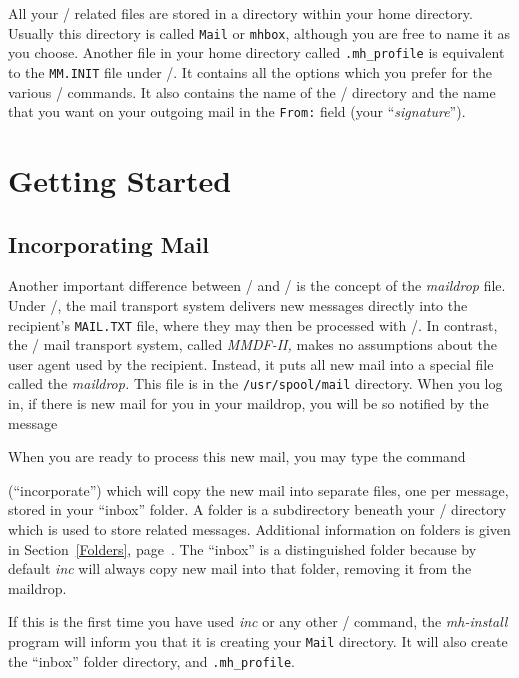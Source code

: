 All your \MH/ related files are stored in a directory within your home
directory.  Usually this directory is called {\tt Mail} or {\tt mhbox},
although you are free to name it as you choose.  Another file in your home
directory called \verb|.mh_profile| is equivalent to the {\tt MM.INIT} file
under \MM/.  It contains all the options which you prefer for the various
\MH/ commands.  It also contains the name of the \MH/ directory and the
name that you want on your outgoing mail in the {\tt From:} field (your
``{\em signature\/}'').

\section{Getting Started}

\subsection{Incorporating Mail}

Another important difference between \MM/ and \MH/ is the concept of the
{\em maildrop\/} file.  Under /, the mail transport system delivers
new messages directly into the recipient's {\tt MAIL.TXT} file, where they may
then be processed with \MM/.  In contrast, the \unix/ mail transport system,
called {\it MMDF-II,} makes no assumptions about the user agent used by the
recipient.  Instead, it puts all new mail into a special file called the
{\em maildrop.}  This file is in the \verb|/usr/spool/mail| directory.
When you log in, if there is new mail for you in your
maildrop, you will be so notified by the message


When you are ready to process this new mail, you may type the command


(``incorporate'') which will copy the new mail into separate files, one per
message, stored in your ``inbox'' folder.  A folder is a subdirectory
beneath your \MH/ directory which is used to store related messages.
Additional information on folders is given in Section~\ref{Folders},
page~\pageref{Folders}.  The
``inbox'' is a distinguished folder because by default {\it inc\/} will
always copy new mail into that folder, removing it from the maildrop.

If this is the first time you have used {\it inc\/} or any other \MH/
command, the {\it mh-install\/} program  will inform you that it is
creating your {\tt Mail} directory. It will also create
the ``inbox'' folder directory, and \verb|.mh_profile|.  

